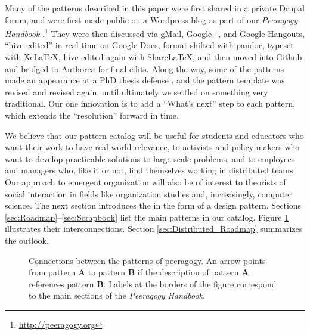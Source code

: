 Many of the patterns described in this paper were first shared in a private Drupal forum, and were first made public on a Wordpress blog as part of our \emph{Peeragogy Handbook} \cite{peeragogy-handbook}.\footnote{\url{http://peeragogy.org}}  They were then discussed via gMail, Google+, and Google Hangouts, ``hive edited'' in real time on Google Docs, format-shifted with pandoc, typeset with XeLaTeX, hive edited again with ShareLaTeX, and then moved into Github and bridged to Authorea for final edits.  Along the way, some of the patterns made an appearance at a PhD thesis defense \cite{corneli-thesis}, and the pattern template was revised and revised again, until ultimately we settled on something very traditional.  Our one innovation is to add a ``What's next'' step to each pattern, which extends the ``resolution'' forward in time.


% 

We believe that our pattern catalog will be useful for students and educators who want their work to have real-world relevance, to activists and policy-makers who want to develop practicable solutions to large-scale problems, and to employees and managers who, like it or not, find themselves working in distributed teams.   Our approach to emergent organization will also be of interest to theorists of social interaction in fields like organization studies and, increasingly, computer science.  The next section introduces the  in the form of a design pattern.  Sections \ref{sec:Roadmap}--\ref{sec:Scrapbook} list the main patterns in our catalog.    Figure \ref{fig:connections} illustrates their interconnections.  Section \ref{sec:Distributed_Roadmap} summarizes the outlook.

\begin{figure}
\vspace{-.9in}
{\centering


\par
}
\vspace{-.9in}
\caption{Connections between the patterns of peeragogy.  An arrow points from pattern \textbf{A} to pattern \textbf{B} if the description of pattern \textbf{A} references pattern \textbf{B}. Labels at the borders of the figure correspond to the main sections of the \emph{Peeragogy Handbook}.\label{fig:connections}}
\end{figure}

